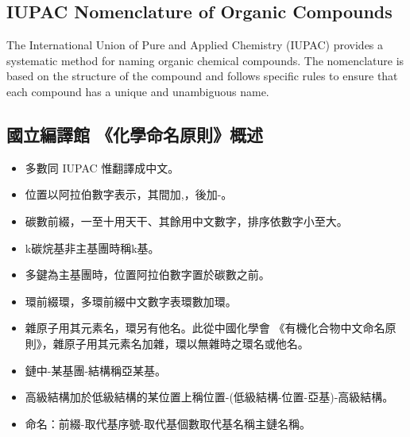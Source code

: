 \documentclass[a4paper,12pt]{report}
\begin{document}
\subsection{IUPAC Nomenclature of Organic Compounds}
The International Union of Pure and Applied Chemistry (IUPAC) provides a systematic method for naming organic chemical compounds. The nomenclature is based on the structure of the compound and follows specific rules to ensure that each compound has a unique and unambiguous name.
\subsection{國立編譯館
《化學命名原則》概述}
\begin{itemize}
\item 多數同 IUPAC 惟翻譯成中文。
\item 位置以阿拉伯數字表示，其間加,，後加-。
\item 碳數前綴，一至十用天干、其餘用中文數字，排序依數字小至大。
\item k碳烷基非主基團時稱k基。
\item 多鍵為主基團時，位置阿拉伯數字置於碳數之前。
\item 環前綴環，多環前綴中文數字表環數加環。
\item 雜原子用其元素名，環另有他名。此從中國化學會
《有機化合物中文命名原則》，雜原子用其元素名加雜，環以無雜時之環名或他名。
\item 鏈中-某基團-結構稱亞某基。
\item 高級結構加於低級結構的某位置上稱位置-(低級結構-位置-亞基)-高級結構。
\item 命名：前綴-取代基序號-取代基個數取代基名稱主鏈名稱。
\end{itemize}
\end{document}
